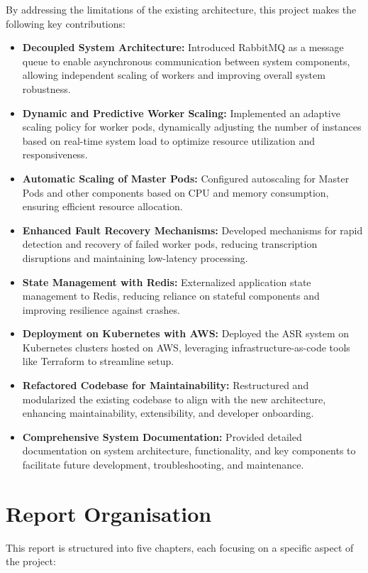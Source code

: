 By addressing the limitations of the existing architecture, this project makes the following key contributions:

\begin{itemize}
    \item \textbf{Decoupled System Architecture:} Introduced RabbitMQ as a message queue to enable asynchronous communication between system components, allowing independent scaling of workers and improving overall system robustness.
    
    \item \textbf{Dynamic and Predictive Worker Scaling:} Implemented an adaptive scaling policy for worker pods, dynamically adjusting the number of instances based on real-time system load to optimize resource utilization and responsiveness.

    \item \textbf{Automatic Scaling of Master Pods:} Configured autoscaling for Master Pods and other components based on CPU and memory consumption, ensuring efficient resource allocation.

    \item \textbf{Enhanced Fault Recovery Mechanisms:} Developed mechanisms for rapid detection and recovery of failed worker pods, reducing transcription disruptions and maintaining low-latency processing.

    \item \textbf{State Management with Redis:} Externalized application state management to Redis, reducing reliance on stateful components and improving resilience against crashes.

    \item \textbf{Deployment on Kubernetes with AWS:} Deployed the ASR system on Kubernetes clusters hosted on AWS, leveraging infrastructure-as-code tools like Terraform to streamline setup.

    \item \textbf{Refactored Codebase for Maintainability:} Restructured and modularized the existing codebase to align with the new architecture, enhancing maintainability, extensibility, and developer onboarding.

    \item \textbf{Comprehensive System Documentation:} Provided detailed documentation on system architecture, functionality, and key components to facilitate future development, troubleshooting, and maintenance.
\end{itemize}


\section{Report Organisation}
This report is structured into five chapters, each focusing on a specific aspect of the project:

